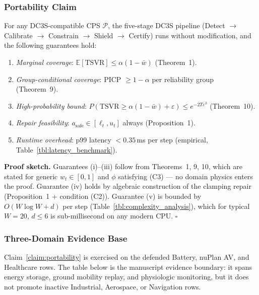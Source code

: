 \subsubsection*{Portability Claim}

\begin{claim}
\label{claim:portability}
For any DC3S-compatible CPS $\mathcal{P}$, the five-stage DC3S pipeline
(Detect $\to$ Calibrate $\to$ Constrain $\to$ Shield $\to$ Certify) runs
without modification, and the following guarantees hold:
\begin{enumerate}[label=(\roman*)]
  \item \emph{Marginal coverage}: $\mathbb{E}[\text{TSVR}] \leq \alpha(1 - \bar{w})$
        (Theorem~1).
  \item \emph{Group-conditional coverage}: PICP $\geq 1-\alpha$ per reliability
        group (Theorem~9).
  \item \emph{High-probability bound}: $P(\text{TSVR} \geq \alpha(1-\bar{w}) + \varepsilon)
        \leq e^{-2T\varepsilon^2}$ (Theorem~10).
  \item \emph{Repair feasibility}: $a_\text{safe} \in [\ell_t, u_t]$ always
        (Proposition~1).
  \item \emph{Runtime overhead}: p99 latency $< 0.35$\,ms per step
        (empirical, Table~\ref{tbl:latency_benchmark}).
\end{enumerate}
\end{claim}

\textbf{Proof sketch.}
Guarantees (i)--(iii) follow from Theorems~1, 9, 10, which are stated for
generic $w_t \in [0,1]$ and $\phi$ satisfying (C3) — no domain physics enters
the proof.  Guarantee (iv) holds by algebraic construction of the clamping
repair (Proposition~1 + condition (C2)).  Guarantee (v) is bounded by
$O(W \log W + d)$ per step (Table~\ref{tbl:complexity_analysis}), which for
typical $W=20$, $d \leq 6$ is sub-millisecond on any modern CPU. $\square$

\subsubsection*{Three-Domain Evidence Base}

Claim~\ref{claim:portability} is exercised on the defended Battery, nuPlan AV,
and Healthcare rows.  The table below is the manuscript evidence boundary: it
spans energy storage, ground mobility replay, and physiologic monitoring, but it
does not promote inactive Industrial, Aerospace, or Navigation rows.

